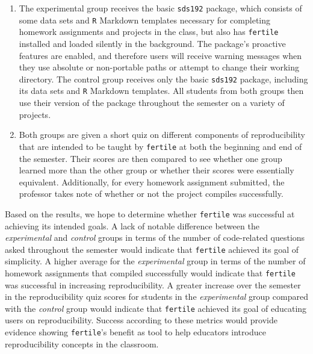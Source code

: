 \documentclass[12pt,twoside]{reedthesis}
\newenvironment{Shaded}{\begin{snugshade}}{\end{snugshade}}
\newcommand{\KeywordTok}[1]{\textcolor[rgb]{0.13,0.29,0.53}{\textbf{#1}}}
\newcommand{\DataTypeTok}[1]{\textcolor[rgb]{0.13,0.29,0.53}{#1}}
\newcommand{\StringTok}[1]{\textcolor[rgb]{0.31,0.60,0.02}{#1}}
\newcommand{\OperatorTok}[1]{\textcolor[rgb]{0.81,0.36,0.00}{\textbf{#1}}}
\newcommand{\NormalTok}[1]{#1}
\begin{document}
\begin{Shaded}
\end{Shaded}
\begin{enumerate}
\def\labelenumi{\arabic{enumi}.}
\setcounter{enumi}{3}
\item
  The experimental group receives the basic \texttt{sds192} package,
  which consists of some data sets and \texttt{R} Markdown templates
  necessary for completing homework assignments and projects in the
  class, but also has \texttt{fertile} installed and loaded silently in
  the background. The package's proactive features are enabled, and
  therefore users will receive warning messages when they use absolute
  or non-portable paths or attempt to change their working directory.
  The control group receives only the basic \texttt{sds192} package,
  including its data sets and \texttt{R} Markdown templates. All
  students from both groups then use their version of the package
  throughout the semester on a variety of projects.
\item
  Both groups are given a short quiz on different components of
  reproducibility that are intended to be taught by \texttt{fertile} at
  both the beginning and end of the semester. Their scores are then
  compared to see whether one group learned more than the other group or
  whether their scores were essentially equivalent. Additionally, for
  every homework assignment submitted, the professor takes note of
  whether or not the project compiles successfully.
\end{enumerate}
Based on the results, we hope to determine whether \texttt{fertile} was
successful at achieving its intended goals. A lack of notable difference
between the \emph{experimental} and \emph{control} groups in terms of
the number of code-related questions asked throughout the semester would
indicate that \texttt{fertile} achieved its goal of simplicity. A higher
average for the \emph{experimental} group in terms of the number of
homework assignments that compiled successfully would indicate that
\texttt{fertile} was successful in increasing reproducibility. A greater
increase over the semester in the reproducibility quiz scores for
students in the \emph{experimental} group compared with the
\emph{control} group would indicate that \texttt{fertile} achieved its
goal of educating users on reproducibility. Success according to these
metrics would provide evidence showing \texttt{fertile}'s benefit as
tool to help educators introduce reproducibility concepts in the
classroom.
\end{document}

